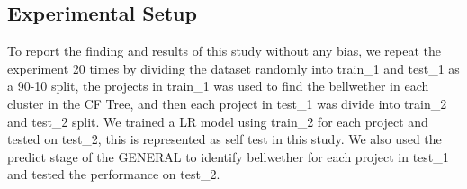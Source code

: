 \documentclass[10pt,journal,compsoc]{IEEEtran}
\newcommand{\bi}{\begin{itemize}}
\begin{document}
\subsection{Experimental Setup}
\label{sec:Experimental}



To report the finding and results of this study without any bias, we repeat the experiment 20 times by dividing the dataset randomly into train\_1 and test\_1 as a 90-10 split, the projects in train\_1 was used to find the bellwether in each cluster in the CF Tree, and then each project in test\_1 was divide into train\_2 and test\_2 split. We trained a LR model using train\_2 for each project and tested on test\_2, this is represented as self test in this study. We also used the predict stage of the GENERAL to identify bellwether for each project in test\_1 and tested the performance on test\_2. 








    
\end{document}

